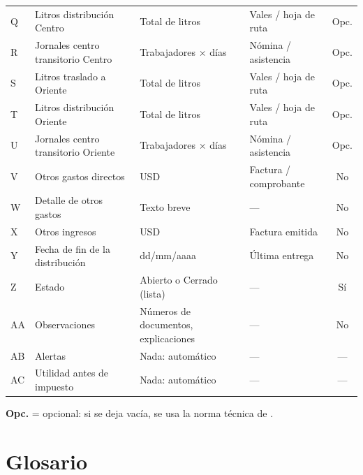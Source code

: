 \begin{longtable}{@{}l>{\raggedright\arraybackslash}p{3.9cm}>{\raggedright\arraybackslash}p{4.9cm}>{\raggedright\arraybackslash}p{3.6cm}c@{}}
Q & Litros distribución Centro & Total de litros & Vales / hoja de ruta & Opc. \\
R & Jornales centro transitorio Centro & Trabajadores $\times$ días & Nómina / asistencia & Opc. \\
S & Litros traslado a Oriente & Total de litros & Vales / hoja de ruta & Opc. \\
T & Litros distribución Oriente & Total de litros & Vales / hoja de ruta & Opc. \\
U & Jornales centro transitorio Oriente & Trabajadores $\times$ días & Nómina / asistencia & Opc. \\
V & Otros gastos directos & USD & Factura / comprobante & No \\
W & Detalle de otros gastos & Texto breve & --- & No \\
X & Otros ingresos & USD & Factura emitida & No \\
Y & Fecha de fin de la distribución & dd/mm/aaaa & Última entrega & No \\
Z & Estado & Abierto o Cerrado (lista) & --- & Sí \\
AA & Observaciones & Números de documentos, explicaciones & --- & No \\
AB & Alertas & Nada: automático & --- & --- \\
AC & Utilidad antes de impuesto & Nada: automático & --- & --- \\
\bottomrule
\end{longtable}
\noindent\textbf{Opc.} = opcional: si se deja vacía, se usa la norma técnica de .

\chapter{Glosario}\label{anx:glosario}

